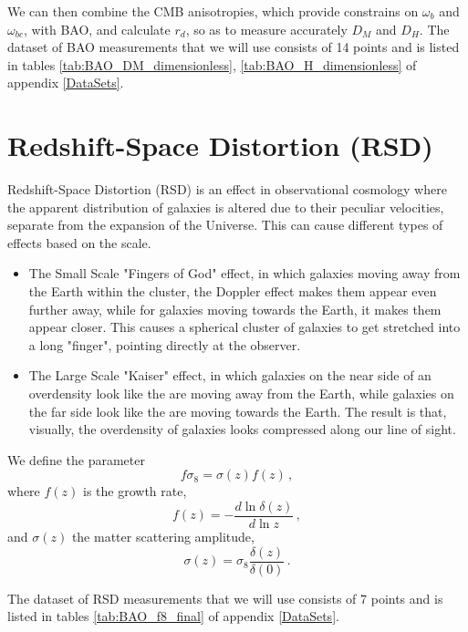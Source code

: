 \documentclass{book}
\begin{document}
	We can then combine the CMB anisotropies, which provide constrains on $\omega_{b}$ and $\omega_{bc}$, with BAO, and calculate $r_d$, so as to measure accurately $D_M$ and $D_H$. The dataset of BAO measurements that we will use consists of 14 points and is listed in tables \ref{tab:BAO_DM_dimensionless}, \ref{tab:BAO_H_dimensionless} of appendix \ref{DataSets}. 
	
	\section{Redshift-Space Distortion (RSD)}
	Redshift-Space Distortion (RSD) is an effect in observational cosmology where the apparent distribution of galaxies is altered due to their peculiar velocities, separate from the expansion of the Universe. This can cause different types of effects based on the scale.
	\begin{itemize}
		\item The Small Scale "Fingers of God" effect, in which galaxies moving away from the Earth within the cluster, the Doppler effect makes them appear even further away, while for galaxies moving towards the Earth, it makes them appear closer. This causes a spherical cluster of galaxies to get stretched into a long "finger", pointing directly at the observer.
		\item The Large Scale "Kaiser" effect, in which galaxies on the near side of an overdensity look like the are moving away from the Earth, while galaxies on the far side look like the are moving towards the Earth. The result is that, visually, the overdensity of galaxies looks compressed along our line of sight. 
	\end{itemize}
	
	We define the parameter
	\begin{equation}
		f\sigma_8=\sigma(z)f(z) \, ,
	\end{equation}
	where $f(z)$ is the growth rate,
	\begin{equation}
		f(z)=-\frac{d \ln \delta(z)}{d \ln z} \, ,
	\end{equation}
	and $\sigma(z)$ the matter scattering amplitude,
	\begin{equation}
		\sigma(z)=\sigma_8 \frac{\delta(z)}{\delta(0)} \, .
	\end{equation}
	
	The dataset of RSD measurements that we will use consists of 7 points and is listed in tables \ref{tab:BAO_f8_final} of appendix \ref{DataSets}.
	
\end{document}
